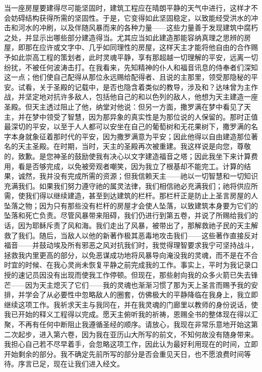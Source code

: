 当一座房屋要建得尽可能坚固时，建筑工程应在晴朗平静的天气中进行，这样才不会妨碍结构获得所需的坚固性。于是，它变得如此坚固稳定，以致能经受洪水的冲击和河水的冲刷，以及伴随风暴而来的各种力量——这些力量善于发现建筑中腐朽之处，并显示出哪些部分建造得当。尤其应当如此建造那能容纳真理之思辨的房屋，即那在应许或文字中、几乎如同理性的房屋，这样天主才能将他自由的合作赐予如此崇高工程的策划者，此时灵魂平静，享有那超越一切理解的平安，远离一切纷扰，不被任何波涛击打。在我看来，先知精神的仆人和福音讯息的侍奉者们深知这一点；他们使自己配得从那位永远赐给配得者、且说的主那里，领受那隐秘的平安。试看，关于圣殿的记载中，是否也隐含着类似的教导，涉及和？达味曾为主作战，并坚定地对抗许多敌人，包括他自己的和以色列的敌人，他想为天主建造一座圣殿。但天主透过阻止了他，纳堂对他说：但另一方面，撒罗满在梦中看见了天主，并在梦中领受了智慧，因为那异象的真实性是为那位说的人保留的。那时正值最深切的平安，以至于人人都可以安坐在自己的葡萄树和无花果树下，撒罗满的名字本身就象征着那时代的平安，因为撒罗满意为平安；因此他得以自由建造那位著名的天主圣殿。在时期，当时，天主的圣殿再次被重建。我这样说是向您，尊敬的，致歉。是您神圣的鼓励使我有决心以文字建造福音之塔；因此我坐下来计算费用，看是否够完成，以免被旁观者嘲笑，因为我立了根基却不能完工。计算的结果，诚然，我并没有完成所需的资源；但我信赖天主——祂以一切智慧和一切知识充满我们。如果我们努力遵守祂的属灵法律，我们相信祂必充满我们；祂将供应所需，使我们得以继续建造，甚至到达建筑的栏杆。那栏杆正是防止上圣言房屋的人坠落之物；因为只有那些没有栏杆的房屋才会使人坠落，以致建筑本身要为它们的坠落和死亡负责。尽管风暴带来阻碍，我们仍进行到第五卷，并说了所赐给我们的话，因为耶稣斥责了风和海。我们走出了风暴，被带出了，那解救祂子民的天主解救了我们。随后，当敌人以他的新著作极其恶毒地攻击我们——这些著作直接反对福音——并鼓动埃及所有邪恶之风对抗我们时，我觉得理智要求我宁可坚持战斗，拯救我内里更高的部分，以免恶谋成功地将风暴导向淹没我的灵魂，而不是在不合时宜的时候、在我心灵尚未恢复平静之前完成我的工作。事实上，平时为我记录口授的速记员因没有出现而使我工作停顿。但现在，那些射向我的众多火箭已失去锋芒——因为天主熄灭了它们——我的灵魂也渐渐习惯了那为天上圣言而赐予我的安排，并学会了从必要性中忽略敌人的圈套，仿佛极大的平静降临在我身上，我立即继续这项工作。我祈求天主与我同在，并在我灵魂的门廊里以教师的身份说话，使我已开始的释义工程得以完成。愿天主俯听我的祈祷，恩赐全书的整体现在得以汇聚，不再有任何中断阻止我遵循圣经的顺序。请放心，我现在非常乐意地开始这第二次起步，进入第六卷，因为我在亚历山大所写的前文，不知何故没有随身带来。我担心自己若不尽早着手，会忽略这项工作，因此认为最好利用现在的时间，立即开始剩余的部分。我不确定先前所写的部分是否会重见天日，也不愿浪费时间等待。序言已足，现在让我们进入经文。\par

